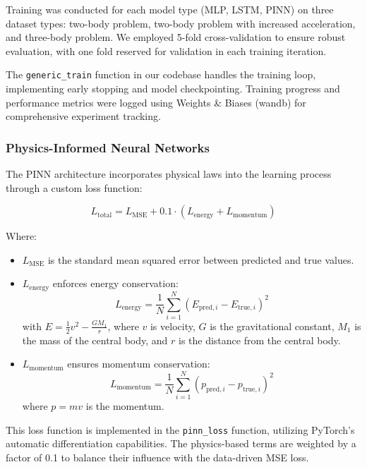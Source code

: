 \documentclass[12pt,a4paper]{article}
\begin{document}
Training was conducted for each model type (MLP, LSTM, PINN) on three dataset types: two-body problem, two-body problem with increased acceleration, and three-body problem. We employed 5-fold cross-validation to ensure robust evaluation, with one fold reserved for validation in each training iteration.

The \texttt{generic\_train} function in our codebase handles the training loop, implementing early stopping and model checkpointing. Training progress and performance metrics were logged using Weights \& Biases (wandb) for comprehensive experiment tracking.

\subsubsection{Physics-Informed Neural Networks}
The PINN architecture incorporates physical laws into the learning process through a custom loss function:

\begin{equation}
L_{\text{total}} = L_{\text{MSE}} + 0.1 \cdot (L_{\text{energy}} + L_{\text{momentum}})
\end{equation}

Where:
\begin{itemize}
    \item $L_{\text{MSE}}$ is the standard mean squared error between predicted and true values.
    \item $L_{\text{energy}}$ enforces energy conservation:
    \begin{equation}
    L_{\text{energy}} = \frac{1}{N} \sum_{i=1}^N (E_{\text{pred},i} - E_{\text{true},i})^2
    \end{equation}
    with $E = \frac{1}{2}v^2 - \frac{GM_1}{r}$, where $v$ is velocity, $G$ is the gravitational constant, $M_1$ is the mass of the central body, and $r$ is the distance from the central body.

    \item $L_{\text{momentum}}$ ensures momentum conservation:
    \begin{equation}
    L_{\text{momentum}} = \frac{1}{N} \sum_{i=1}^N (p_{\text{pred},i} - p_{\text{true},i})^2
    \end{equation}
    where $p = mv$ is the momentum.
\end{itemize}

This loss function is implemented in the \texttt{pinn\_loss} function, utilizing PyTorch's automatic differentiation capabilities. The physics-based terms are weighted by a factor of 0.1 to balance their influence with the data-driven MSE loss.
\end{document}
